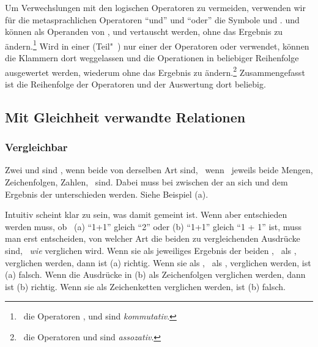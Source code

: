 Um Verwechslungen mit den logischen Operatoren zu vermeiden, verwenden wir für die metasprachlichen Operatoren \enquote{und} und \enquote{oder} die Symbole \symqt{\metaandsym} und \symqt{\metaorsym}.
 und  können als Operanden von \objqt{\metaequiv}, \objqt{\metaandsym} und \objqt{\metaorsym} vertauscht werden, ohne das Ergebnis zu ändern.\footnote{%
	\textDh\ die Operatoren \objqt{\metaequiv}, \objqt{\metaandsym} und \objqt{\metaorsym} sind \emph{kommutativ}.%
}
Wird in einer (Teil"~) nur einer der Operatoren \objqt{\metaandsym} oder \objqt{\metaorsym} verwendet, können die Klammern dort weggelassen und die Operationen in beliebiger Reihenfolge ausgewertet werden, wiederum ohne das Ergebnis zu ändern.\footnote{%
	\textDh\ die Operatoren \objqt{\metaandsym} und \objqt{\metaorsym} sind \emph{assozativ}.%
}
Zusammengefasst ist die Reihenfolge der Operatoren und der Auswertung dort beliebig.

\subsection{Mit Gleichheit verwandte Relationen}%
\label{sub:Gleichheit}

\subsubsection{Vergleichbar}%
\label{subsub:Vergleichbar}

Zwei   und  sind \emph{}, wenn beide von derselben Art sind, \textdh\ wenn \textzB\ jeweils beide Mengen, Zeichenfolgen, Zahlen, \textusw\ sind.
Dabei muss bei  zwischen der  an sich und dem Ergebnis der  unterschieden werden. Siehe Beispiel (a).

Intuitiv scheint klar zu sein, was damit  gemeint ist.
Wenn aber entschieden werden muss, ob \textzB\ (a) \enquote{1+1} gleich \enquote{2} oder (b) \enquote{1+1} gleich \enquote{1 + 1} ist, muss man erst entscheiden, von welcher Art die beiden zu vergleichenden Ausdrücke sind, \textdh\ \emph{wie} verglichen wird.
Wenn sie als jeweiliges Ergebnis der beiden , \textdh\ als , verglichen werden, dann ist (a) richtig.
Wenn sie als , \textdh\ als , verglichen werden, ist (a) falsch.
Wenn die Ausdrücke in (b) als Zeichenfolgen verglichen werden, dann ist (b) richtig.
Wenn sie als Zeichenketten verglichen werden, ist (b) falsch.

